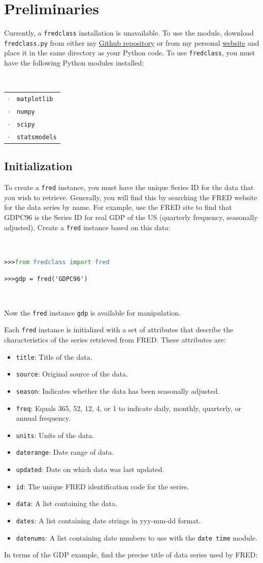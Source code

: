\documentclass[11pt,fleqn]{article}
\newcommand{\IZ}{\begin{itemize}}
\newcommand{\ZI}{\end{itemize}}
\newcommand{\itemb}{\item[]}
\newcommand{\ttt}{\texttt}
\newcommand{\tc}{\textcolor}
\begin{document}
\section{Preliminaries}

Currently, a \ttt{fredclass} installation is unavailable. To use the module, download \ttt{fredclass.py} from either my \href{https://github.com/letsgoexploring/fredclass}{Github repository} or from my personal \href{http://www.briancjenkins.com/code/fredclass.html}{website} and place it in the same directory as your Python code. To use \ttt{fredclass}, you must have the following Python modules installed:

\

\begin{tabular}{rl} 
 $\cdot$ & \ttt{matplotlib}\\
 $\cdot$ & \ttt{numpy}     \\
 $\cdot$ & \ttt{scipy}     \\ 
 $\cdot$ & \ttt{statsmodels}
\end{tabular}

\subsection{Initialization}

To create a \ttt{fred} instance, you must have the unique Series ID for the data that you wish to retrieve. Generally, you will find this by searching the FRED website for the data series by name. For example, use the FRED site to find that GDPC96 is the Series ID for real GDP of the US (quarterly frequency, seasonally adjusted). Create a \ttt{fred} instance based on this data:

\

\begin{minipage}{6.5in}
\ttt{>>>\tc{ForestGreen}{from} \tc{RoyalBlue}{fredclass} \tc{ForestGreen}{import} \tc{RoyalBlue}{fred}}

\verb!>>>gdp = fred('GDPC96')!
\end{minipage}

\

\noindent Now the \ttt{fred} instance \ttt{gdp} is available for manipulation. 

Each \ttt{fred} instance is initialized with a set of attributes that describe the characteristics of the series retrieved from FRED. These attributes are:
	\IZ
	\itemb \ttt{title}: Title of the data.
	\itemb \ttt{source}: Original source of the data.
	\itemb \ttt{season}: Indicates whether the data has been seasonally adjusted.
	\itemb \ttt{freq}: Equals 365, 52, 12, 4, or 1 to indicate daily, monthly, quarterly, or annual frequency.
	\itemb \ttt{units}: Units of the data.
	\itemb \ttt{daterange}: Date range of data.
	\itemb \ttt{updated}: Date on which data was last updated.
	\itemb \ttt{id}: The unique FRED identification code for the series.
	\itemb \ttt{data}: A list containing the data.
	\itemb \ttt{dates}: A list containing date strings in yyy-mm-dd format.
	\itemb \ttt{datenums}: A list containing date numbers to use with the \ttt{date time} module.
	\ZI
In terms of the GDP example, find the precise title of data series used by FRED:
\end{document}
